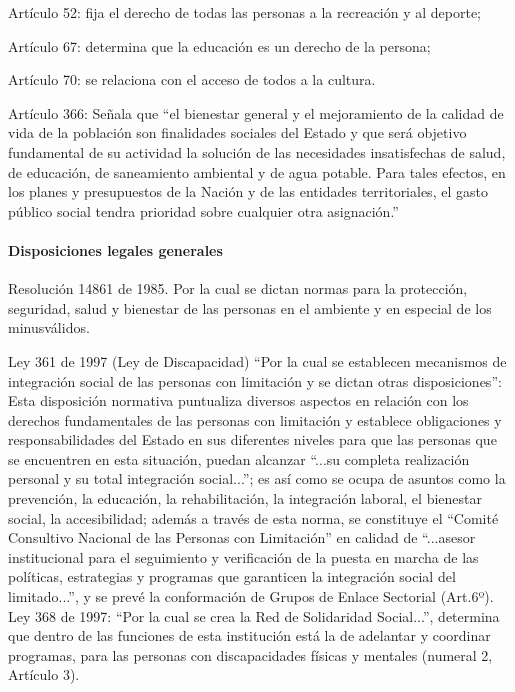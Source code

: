 \documentclass[a4paper, 12pt, oneside]{article}
\begin{document}
	Artículo 52: fija el derecho de todas las personas a la recreación y al deporte;

	Artículo 67: determina que la educación es un derecho de la persona;

	Artículo 70: se relaciona con el acceso de todos a la cultura.

	Artículo 366: Señala que “el bienestar general y el mejoramiento de la calidad de vida de la población son finalidades sociales del Estado y que será objetivo fundamental de su actividad la solución de las necesidades insatisfechas de salud, de educación, de saneamiento ambiental y de agua potable. Para tales efectos, en los planes y presupuestos de la Nación y de las entidades territoriales, el gasto público social tendra prioridad sobre cualquier otra asignación.”

	\paragraph{Disposiciones legales generales}

	Resolución 14861 de 1985. Por la cual se dictan normas para la protección, seguridad, salud y bienestar de las personas en el ambiente y en especial de los minusválidos.

	Ley 361 de 1997 (Ley de Discapacidad) “Por la cual se establecen mecanismos de integración social de las personas con limitación y se dictan otras disposiciones”: Esta disposición normativa puntualiza diversos aspectos en relación con los derechos fundamentales de las personas con limitación y establece obligaciones y responsabilidades del Estado en sus diferentes niveles para que las personas que se encuentren en esta situación, puedan alcanzar “...su completa realización personal y su total integración social...”; es así como se ocupa de asuntos como la prevención, la educación, la rehabilitación, la integración laboral, el bienestar social, la accesibilidad; además a través de esta norma, se constituye el “Comité Consultivo Nacional de las Personas con Limitación” en calidad de “...asesor institucional para el seguimiento y verificación de la puesta en marcha de las políticas, estrategias y programas que garanticen la integración social del limitado...”, y se prevé la conformación de Grupos de Enlace Sectorial (Art.6º).
	Ley 368 de 1997: “Por la cual se crea la Red de Solidaridad Social...”, determina que dentro de las funciones de esta institución está la de adelantar y coordinar programas, para las personas con discapacidades físicas y mentales (numeral 2, Artículo 3).
\end{document}

